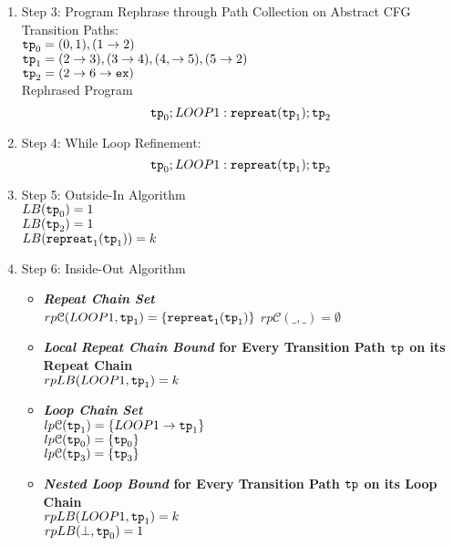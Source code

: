 \begin{enumerate}
  \item Step 3: Program Rephrase through Path Collection on Abstract CFG
  \\
  Transition Paths:
  \\
  $\mathtt{tp}_0 = (0, 1), (1 \to 2)$
  \\
  $\mathtt{tp}_1 =  (2 \to 3), (3 \to 4), (4, \to 5), (5 \to 2)$
  \\
  $\mathtt{tp}_2 = (2 \to 6 \to \mathtt{ex})$
  \\
  Rephrased Program
  \[
  \mathtt{tp}_0 ; LOOP1: \mathtt{repreat}(\mathtt{tp}_1); \mathtt{tp}_2
  \]
  \item Step 4: While Loop Refinement:
  \[
    \mathtt{tp}_0 ; LOOP1: \mathtt{repreat}(\mathtt{tp}_1); \mathtt{tp}_2
  \]
  \item Step 5: Outside-In Algorithm
  \\
  $LB(\mathtt{tp}_0) = 1$
  \\
  $LB(\mathtt{tp}_2) = 1$
  \\
  $LB(\mathtt{repreat}_1(\mathtt{tp}_1)) = k $
  \item Step 6: Inside-Out Algorithm
  \begin{itemize}
    \item \textbf{\emph{Repeat Chain Set}}
    \\
    $rp\mathcal{C}(LOOP1, \mathtt{tp}_1) = \{\mathtt{repreat}_1(\mathtt{tp}_1)\}$ 
    $rp\mathcal{C}(\_, \_) = \emptyset$ 
    \item \textbf{\emph{Local Repeat Chain Bound} for Every Transition Path $\mathtt{tp}$ on its Repeat Chain}
    \\
    $rpLB(LOOP1, \mathtt{tp}_1) = k$
    \item \textbf{\emph{Loop Chain Set}}
    \\
    $lp\mathcal{C}(\mathtt{tp}_1) = \{LOOP1\to \mathtt{tp}_1\}$ \\
    $lp\mathcal{C}(\mathtt{tp}_0) = \{\mathtt{tp}_0\}$ \\
    $lp\mathcal{C}(\mathtt{tp}_3) = \{\mathtt{tp}_3\}$ 
    \item \textbf{\emph{Nested Loop Bound} for Every Transition Path $\mathtt{tp}$ on its Loop Chain}
    \\
    $rpLB(LOOP1, \mathtt{tp}_1) =   k$
  \\
    $rpLB(\bot, \mathtt{tp}_0) = 1$ \\

\end{itemize}
\end{enumerate}
